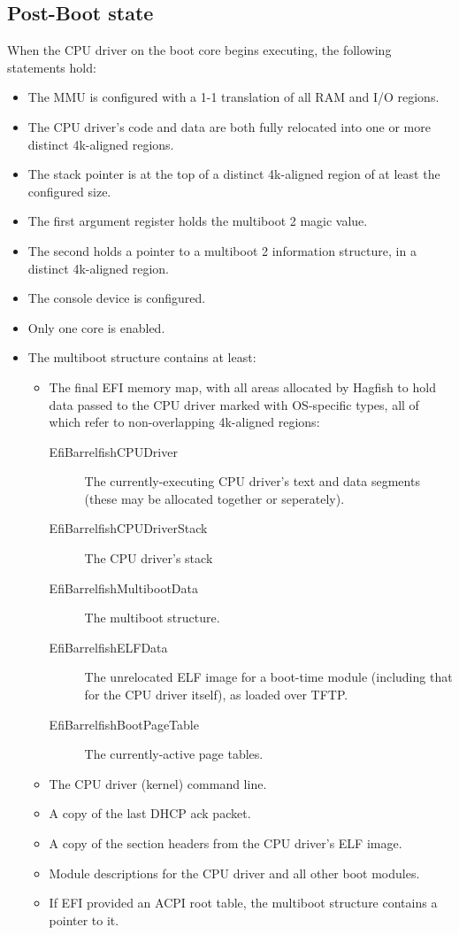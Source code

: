 \documentclass[a4paper,twoside]{report}
\begin{document}
\subsection{Post-Boot state}

When the CPU driver on the boot core begins executing, the following
statements hold:

\begin{itemize}
\item The MMU is configured with a 1-1 translation of all RAM and I/O regions.
\item The CPU driver's code and data are both fully relocated into one or more
distinct 4k-aligned regions.
\item The stack pointer is at the top of a distinct 4k-aligned region of at
least the configured size.
\item The first argument register holds the multiboot 2 magic value.
\item The second holds a pointer to a multiboot 2 information structure, in a
distinct 4k-aligned region.
\item The console device is configured.
\item Only one core is enabled.
\item The multiboot structure contains at least:
    \begin{itemize}
    \item The final EFI memory map, with all areas allocated by Hagfish to
    hold data passed to the CPU driver marked with OS-specific types, all of
    which refer to non-overlapping 4k-aligned regions:
        \begin{description}
        \item[EfiBarrelfishCPUDriver]
        The currently-executing CPU driver's text and data segments (these may
        be allocated together or seperately).
        \item[EfiBarrelfishCPUDriverStack]
        The CPU driver's stack
        \item[EfiBarrelfishMultibootData]
        The multiboot structure.
        \item[EfiBarrelfishELFData]
        The unrelocated ELF image for a boot-time module (including that for
        the CPU driver itself), as loaded over TFTP.
        \item[EfiBarrelfishBootPageTable]
        The currently-active page tables.
        \end{description}
    \item The CPU driver (kernel) command line.
    \item A copy of the last DHCP ack packet.
    \item A copy of the section headers from the CPU driver's ELF image.
    \item Module descriptions for the CPU driver and all other boot modules.
    \item If EFI provided an ACPI root table, the multiboot structure contains
    a pointer to it.
    \end{itemize}
\end{itemize}
\end{document}

